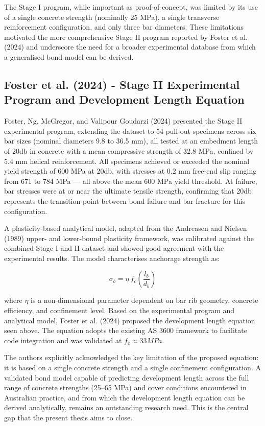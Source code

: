 The Stage I program, while important as proof-of-concept, was limited by its use of a single concrete strength (nominally 25 MPa), a single transverse reinforcement configuration, and only three bar diameters. These limitations motivated the more comprehensive Stage II program reported by Foster et al. (2024) and underscore the need for a broader experimental database from which a generalised bond model can be derived.

\subsection{Foster et al. (2024) - Stage II Experimental Program and Development Length Equation}

Foster, Ng, McGregor, and Valipour Goudarzi (2024) presented the Stage II experimental program, extending the dataset to 54 pull-out specimens across six bar sizes (nominal diameters 9.8 to 36.5 mm), all tested at an embedment length of 20db in concrete with a mean compressive strength of 32.8 MPa, confined by 5.4 mm helical reinforcement. All specimens achieved or exceeded the nominal yield strength of 600 MPa at 20db, with stresses at 0.2 mm free-end slip ranging from 671 to 784 MPa — all above the mean 600 MPa yield threshold. At failure, bar stresses were at or near the ultimate tensile strength, confirming that 20db represents the transition point between bond failure and bar fracture for this configuration.

A plasticity-based analytical model, adapted from the Andreasen and Nielsen (1989) upper- and lower-bound plasticity framework, was calibrated against the combined Stage I and II dataset and showed good agreement with the experimental results. The model characterises anchorage strength as:

\begin{equation}
{\sigma }_{b}=\eta \ f_{c}\left(\frac{l_{b}}{d_{b}}\right)
\end{equation}

where $\eta$ is a non-dimensional parameter dependent on bar rib geometry, concrete efficiency, and confinement level. Based on the experimental program and analytical model, Foster et al. (2024) proposed the development length equation seen above. The equation adopts the existing AS 3600 framework to facilitate code integration and was validated at $f_{c} \approx 33 MPa$.

The authors explicitly acknowledged the key limitation of the proposed equation: it is based on a single concrete strength and a single confinement configuration. A validated bond model capable of predicting development length across the full range of concrete strengths (25–65 MPa) and cover conditions encountered in Australian practice, and from which the development length equation can be derived analytically, remains an outstanding research need. This is the central gap that the present thesis aims to close.

